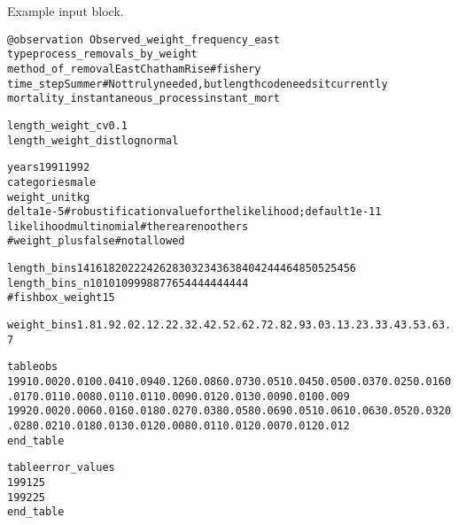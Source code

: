 \documentclass[a4paper,11pt,twoside,pdftex,draft]{article}
\begin{document}
Example input block.

\begin{alltt}
\texttt{@observation Observed\_weight\_frequency\_east}
type process\_removals\_by\_weight
method\_of\_removal EastChathamRise  # fishery
time\_step Summer # Not truly needed, but length code needs it currently
mortality\_instantaneous\_process instant\_mort

length\_weight\_cv 0.1
length\_weight\_dist lognormal

years 1991 1992
categories male
weight\_unit kg
delta 1e-5  # robustification value for the likelihood; default 1e-11
likelihood multinomial	#there are no others
#weight\_plus false        #not allowed

length\_bins 14 16 18 20 22 24 26 28 30 32 34 36 38 40 42 44 46 48 50 52 54 56
length\_bins\_n 10 10 10 9 9 9 8 8 7 7 6 5 4 4 4 4 4 4 4 4 4 4
#fishbox\_weight 15

weight\_bins 1.8 1.9 2.0 2.1 2.2 2.3 2.4 2.5 2.6 2.7 2.8 2.9 3.0 3.1 3.2 3.3 3.4 3.5 3.6 3.7 % 3.8 3.9 4.0 4.1 4.2 4.3 4.4 4.5 4.6 4.7 4.8 4.9 5.0 5.1 5.2 5.3 5.4 5.5 5.6 5.7 5.8 5.9 6.0 6.1 6.2 6.3 6.4 6.5 6.6 6.7 6.8 6.9 7.0 7.1 7.2 7.3 7.4 7.5 7.6 7.7 7.8 7.9 8.0 8.1 8.2 8.3 8.4 8.5 8.6 8.7 8.8 8.9 9.0 9.1 9.2 9.3 9.4 9.5 9.6 9.7 9.8 9.9 10.0 10.1 10.2 10.3 10.4 10.5 10.6 10.7 10.8 10.9 11.0 11.1 11.2 11.3 11.4 11.5 11.6 11.7 11.8

table obs
1991 0.002 0.010 0.041 0.094 0.126 0.086 0.073 0.051 0.045 0.050 0.037 0.025 0.016 0.017 0.011 0.008 0.011 0.011 0.009 0.012 0.013 0.009 0.010 0.009 % 0.0100.0070.0080.0060.0050.0100.0080.0140.0080.0120.0060.0070.0090.0050.0070.0060.0040.0060.0040.0040.0070.0050.0020.0060.0040.0030.0040.0020.0040.0030.0020.0020.0020.0010.0020.0030.0010.0020.0010.0010.0010.0010.0010.0010.0010.0000.0010.0010.0000.0010.0010.0010.0010.0000.0010.0010.0010.0010.0010.0010.0000.0010.0000.0010.0000.0000.0010.0000.0000.0000.0000.0000.0000.0000.0000.001
1992 0.002 0.006 0.016 0.018 0.027 0.038 0.058 0.069 0.051 0.061 0.063 0.052 0.032 0.028 0.021 0.018 0.013 0.012 0.008 0.011 0.012 0.007 0.012 0.012 % 0.0150.0070.0090.0110.0090.0100.0140.0130.0120.0190.0110.0130.0130.0090.0100.0140.0080.0090.0060.0060.0080.0080.0050.0080.0070.0060.0030.0060.0060.0040.0020.0040.0070.0030.0040.0030.0020.0030.0020.0020.0020.0020.0020.0020.0020.0020.0020.0010.0010.0010.0020.0020.0010.0020.0020.0020.0010.0010.0010.0020.0010.0010.0010.0010.0010.0000.0010.0010.0000.0010.0010.0000.0000.0010.0000.001
end\_table

table error\_values
1991 25
1992 25
end\_table
\end{alltt}
\end{document}
